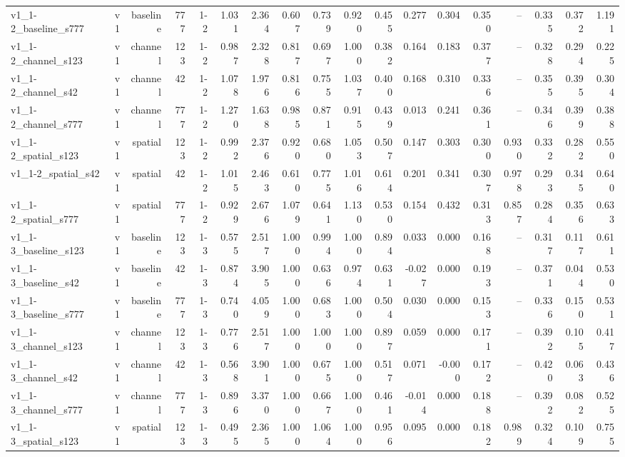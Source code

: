 \begin{table}[t]
\begin{tabular}{lrrrrrrrrrrrrrrrrr}
v1\_1-2\_baseline\_s777 & v1 & baseline & 777 & 1-2 & 1.031 & 2.364 & 0.607 & 0.739 & 0.920 & 0.455 & 0.277 & 0.304 & 0.350 & -- & 0.335 & 0.372 & 1.191 \\
v1\_1-2\_channel\_s123 & v1 & channel & 123 & 1-2 & 0.987 & 2.328 & 0.817 & 0.697 & 1.000 & 0.382 & 0.164 & 0.183 & 0.377 & -- & 0.328 & 0.294 & 0.225 \\
v1\_1-2\_channel\_s42 & v1 & channel & 42 & 1-2 & 1.078 & 1.976 & 0.816 & 0.755 & 1.037 & 0.400 & 0.168 & 0.310 & 0.336 & -- & 0.355 & 0.395 & 0.304 \\
v1\_1-2\_channel\_s777 & v1 & channel & 777 & 1-2 & 1.270 & 1.638 & 0.985 & 0.871 & 0.915 & 0.439 & 0.013 & 0.241 & 0.361 & -- & 0.346 & 0.399 & 0.388 \\
v1\_1-2\_spatial\_s123 & v1 & spatial & 123 & 1-2 & 0.992 & 2.376 & 0.920 & 0.680 & 1.053 & 0.507 & 0.147 & 0.303 & 0.300 & 0.930 & 0.332 & 0.282 & 0.550 \\
v1\_1-2\_spatial\_s42 & v1 & spatial & 42 & 1-2 & 1.015 & 2.463 & 0.610 & 0.775 & 1.016 & 0.614 & 0.201 & 0.341 & 0.307 & 0.978 & 0.293 & 0.345 & 0.640 \\
v1\_1-2\_spatial\_s777 & v1 & spatial & 777 & 1-2 & 0.929 & 2.676 & 1.079 & 0.641 & 1.130 & 0.530 & 0.154 & 0.432 & 0.313 & 0.857 & 0.284 & 0.356 & 0.633 \\
v1\_1-3\_baseline\_s123 & v1 & baseline & 123 & 1-3 & 0.575 & 2.517 & 1.000 & 0.994 & 1.000 & 0.894 & 0.033 & 0.000 & 0.168 & -- & 0.317 & 0.117 & 0.611 \\
v1\_1-3\_baseline\_s42 & v1 & baseline & 42 & 1-3 & 0.874 & 3.905 & 1.000 & 0.636 & 0.974 & 0.631 & -0.027 & 0.000 & 0.193 & -- & 0.371 & 0.044 & 0.530 \\
v1\_1-3\_baseline\_s777 & v1 & baseline & 777 & 1-3 & 0.740 & 4.059 & 1.000 & 0.683 & 1.000 & 0.504 & 0.030 & 0.000 & 0.153 & -- & 0.336 & 0.150 & 0.531 \\
v1\_1-3\_channel\_s123 & v1 & channel & 123 & 1-3 & 0.776 & 2.517 & 1.000 & 1.000 & 1.000 & 0.897 & 0.059 & 0.000 & 0.171 & -- & 0.392 & 0.105 & 0.417 \\
v1\_1-3\_channel\_s42 & v1 & channel & 42 & 1-3 & 0.568 & 3.901 & 1.000 & 0.675 & 1.000 & 0.517 & 0.071 & -0.000 & 0.172 & -- & 0.420 & 0.063 & 0.436 \\
v1\_1-3\_channel\_s777 & v1 & channel & 777 & 1-3 & 0.896 & 3.370 & 1.000 & 0.667 & 1.000 & 0.461 & -0.014 & 0.000 & 0.188 & -- & 0.392 & 0.082 & 0.525 \\
v1\_1-3\_spatial\_s123 & v1 & spatial & 123 & 1-3 & 0.495 & 2.365 & 1.000 & 1.064 & 1.000 & 0.956 & 0.095 & 0.000 & 0.182 & 0.989 & 0.324 & 0.109 & 0.755 \\

\end{tabular}
\end{table}
